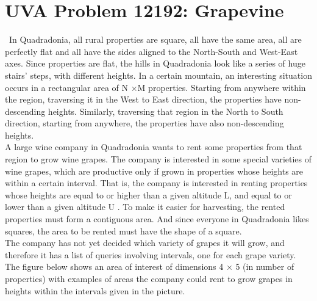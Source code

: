 \documentclass[12pt]{article}
\begin{document}

\newcommand{\hmwkClass}{COS 255}
\newcommand{\hmwkSemester}{Spring 2016}

\newcommand{\hmwkAuthorName}{Lukas Leung}
\newcommand{\hmwkAuthorID}{lleung}

\newcommand{\hmwkAssignmentNum}{3}

\newcommand{\hmwkProblemNum}{0}

\newcommand{\hmwkCollaborators}{}
\thispagestyle{fancycollab}




\section{UVA Problem 12192: Grapevine}
~\indent In Quadradonia, all rural properties are square, all have the same area, all are perfectly flat and all
have the sides aligned to the North-South and West-East axes.
Since properties are flat, the hills in Quadradonia look like a series of huge stairs’ steps, with different
heights. In a certain mountain, an interesting situation occurs in a rectangular area of N ×M properties.
Starting from anywhere within the region, traversing it in the West to East direction, the properties
have non-descending heights. Similarly, traversing that region in the North to South direction, starting
from anywhere, the properties have also non-descending heights. \\
\indent A large wine company in Quadradonia wants to rent some properties from that region to grow wine
grapes. The company is interested in some special varieties of wine grapes, which are productive only
if grown in properties whose heights are within a certain interval. That is, the company is interested in
renting properties whose heights are equal to or higher than a given altitude L, and equal to or lower
than a given altitude U . To make it easier for harvesting, the rented properties must form a contiguous
area. And since everyone in Quadradonia likes squares, the area to be rented must have the shape of
a square. \\
\indent The company has not yet decided which variety of grapes it will grow, and therefore it has a list
of queries involving intervals, one for each grape variety. The figure below shows an area of interest
of dimensions 4 × 5 (in number of properties) with examples of areas the company could rent to grow
grapes in heights within the intervals given in the picture.
\end{document}

